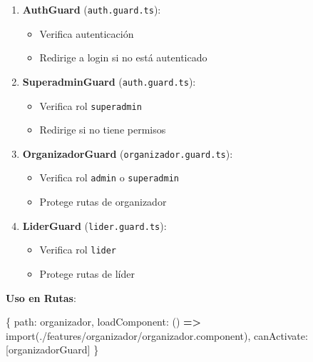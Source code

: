 \documentclass[
  spanish,
  11pt,
  letterpaper,
]{book}
\newenvironment{Shaded}{\begin{snugshade}}{\end{snugshade}}
\newcommand{\ImportTok}[1]{\textcolor[rgb]{0.00,0.46,0.62}{#1}}
\newcommand{\KeywordTok}[1]{\textcolor[rgb]{0.00,0.23,0.31}{\textbf{#1}}}
\newcommand{\NormalTok}[1]{\textcolor[rgb]{0.00,0.23,0.31}{#1}}
\newcommand{\OperatorTok}[1]{\textcolor[rgb]{0.37,0.37,0.37}{#1}}
\newcommand{\StringTok}[1]{\textcolor[rgb]{0.13,0.47,0.30}{#1}}
\providecommand{\tightlist}{%
  \setlength{\itemsep}{0pt}\setlength{\parskip}{0pt}}
\begin{document}
\begin{enumerate}
\def\labelenumi{\arabic{enumi}.}
\tightlist
\item
  \textbf{AuthGuard} (\texttt{auth.guard.ts}):

  \begin{itemize}
  \tightlist
  \item
    Verifica autenticación
  \item
    Redirige a login si no está autenticado
  \end{itemize}
\item
  \textbf{SuperadminGuard} (\texttt{auth.guard.ts}):

  \begin{itemize}
  \tightlist
  \item
    Verifica rol \texttt{superadmin}
  \item
    Redirige si no tiene permisos
  \end{itemize}
\item
  \textbf{OrganizadorGuard} (\texttt{organizador.guard.ts}):

  \begin{itemize}
  \tightlist
  \item
    Verifica rol \texttt{admin} o \texttt{superadmin}
  \item
    Protege rutas de organizador
  \end{itemize}
\item
  \textbf{LiderGuard} (\texttt{lider.guard.ts}):

  \begin{itemize}
  \tightlist
  \item
    Verifica rol \texttt{lider}
  \item
    Protege rutas de líder
  \end{itemize}
\end{enumerate}

\textbf{Uso en Rutas}:

\begin{Shaded}
\begin{Highlighting}[]
\NormalTok{\{}
\NormalTok{  path}\OperatorTok{:} \StringTok{\textquotesingle{}organizador\textquotesingle{}}\OperatorTok{,}
\NormalTok{  loadComponent}\OperatorTok{:}\NormalTok{ () }\KeywordTok{=\textgreater{}} \ImportTok{import}\NormalTok{(}\StringTok{\textquotesingle{}./features/organizador/organizador.component\textquotesingle{}}\NormalTok{)}\OperatorTok{,}
\NormalTok{  canActivate}\OperatorTok{:}\NormalTok{ [organizadorGuard]}
\NormalTok{\}}
\end{Highlighting}
\end{Shaded}
\end{document}
